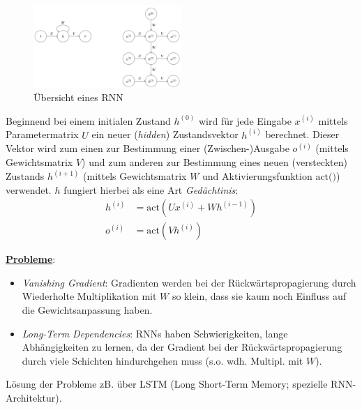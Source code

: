 \begin{figure}[H]
    \centering
    \includegraphics[width=0.5\textwidth]{deepLearning/rnn_overview.png}
    \caption{Übersicht eines RNN}
\end{figure}
Beginnend bei einem initialen Zustand $h^{(0)}$ wird für jede Eingabe $x^{(i)}$ mittels Parametermatrix $U$ ein neuer (\emph{hidden}) Zustandsvektor $h^{(i)}$ berechnet. Dieser Vektor wird zum einen zur Bestimmung einer (Zwischen-)Ausgabe $o^{(i)}$ (mittels Gewichtsmatrix $V$) und zum anderen zur Bestimmung eines neuen (versteckten) Zustands $h^{(i+1)}$ (mittels Gewichtsmatrix $W$ und Aktivierungsfunktion $\text{act()}$) verwendet. $h$ fungiert hierbei als eine Art \emph{Gedächtinis}:\\

\begin{equation*}
    \begin{aligned}
        h^{(i)} &= \text{act}(Ux^{(i)} + Wh^{(i-1)})\\
        o^{(i)} &= \text{act}(Vh^{(i)})
    \end{aligned}
\end{equation*}

\underline{\textbf{Probleme}}:
\begin{itemize}
    \item \emph{Vanishing Gradient}: Gradienten werden bei der Rückwärtspropagierung durch Wiederholte Multiplikation mit $W$ so klein, dass sie kaum noch Einfluss auf die Gewichtsanpassung haben.
    \item \emph{Long-Term Dependencies}: RNNs haben Schwierigkeiten, lange Abhängigkeiten zu lernen, da der Gradient bei der Rückwärtspropagierung durch viele Schichten hindurchgehen muss (s.o. wdh. Multipl. mit $W$).
\end{itemize}
Lösung der Probleme zB. über LSTM (Long Short-Term Memory; spezielle RNN-Architektur).\\